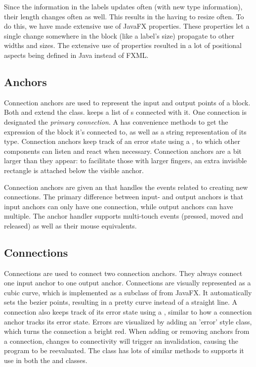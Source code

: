 Since the information in the labels updates often (with new type information), their length changes often as well. This results in the  having to resize often. To do this, we have made extensive use of JavaFX properties. These properties let a single change somewhere in the block (like a label's size) propagate to other widths and sizes. The extensive use of properties resulted in a lot of positional aspects being defined in Java instead of FXML.

\subsection{Anchors}
Connection anchors are used to represent the input and output points of a block. Both  and  extend the  class.  keeps a list of s connected with it. One connection is designated the \emph{primary connection}. A  has convenience methods to get the expression of the block it's connected to, as well as a string representation of its type. Connection anchors keep track of an error state using a , to which other components can listen and react when necessary. Connection anchors are a bit larger than they appear: to facilitate those with larger fingers, an extra invisible rectangle is attached below the visible anchor.

Connection anchors are given an  that handles the events related to creating new connections. The primary difference between input- and output anchors is that input anchors can only have one connection, while output anchors can have multiple. The anchor handler supports multi-touch events (pressed, moved and released) as well as their mouse equivalents.

\subsection{Connections}
Connections are used to connect two connection anchors. They always connect one input anchor to one output anchor. Connections are visually represented as a cubic curve, which is implemented as a subclass of  from JavaFX. It automatically sets the bezier points, resulting in a pretty curve instead of a straight line. A connection also keeps track of its error state using a , similar to how a connection anchor tracks its error state. Errors are visualized by adding an 'error' style class, which turns the connection a bright red. When adding or removing anchors from a connection, changes to connectivity will trigger an invalidation, causing the program to be reevaluated. The  class has lots of similar methods to supports it use in both the  and  classes.

